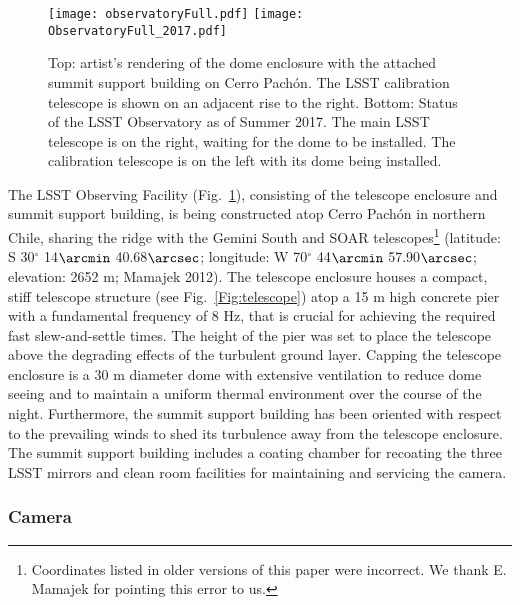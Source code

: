 \begin{figure}
\texttt{[image: observatoryFull.pdf]}
\texttt{[image: ObservatoryFull\_2017.pdf]}
\caption{Top: artist's rendering of the dome enclosure
with the attached summit support building on Cerro Pach\'{o}n. The LSST calibration
telescope is shown on an adjacent rise to the right.
Bottom: Status of the LSST Observatory as of Summer 2017. The main LSST telescope is on the right, waiting for the dome to be installed. The calibration telescope is on the left with its dome being installed.}
\label{Fig:observatory}
\end{figure}

The LSST Observing Facility (Fig.~\ref{Fig:observatory}),
consisting of the telescope enclosure and summit support building, is being constructed atop Cerro Pach\'{o}n in northern Chile,
sharing the ridge with the Gemini South and SOAR telescopes\footnote{Coordinates listed in older versions
of this paper were incorrect. We thank E. Mamajek for pointing this error to us.}
(latitude: S 30$^\circ$ 14$\arcmin$ 40.68$\arcsec$; longitude: W 70$^\circ$ 44$\arcmin$ 57.90$\arcsec$; elevation: 2652 m;
Mamajek 2012).  The telescope enclosure houses a compact, stiff
telescope structure (see Fig.~\ref{Fig:telescope}) atop a 15 m high concrete pier
with a fundamental frequency of 8 Hz, that is crucial for achieving the required fast slew-and-settle times.  The height of the pier was set to place the telescope above the degrading
effects of the turbulent ground layer.  Capping the telescope
enclosure is a 30 m diameter dome with extensive ventilation to reduce
dome seeing
and to maintain a uniform thermal environment over the course of the night.  Furthermore, the summit support
building has been oriented with respect to the prevailing winds to shed its turbulence away from the
telescope enclosure.  The summit support building includes a coating chamber for recoating the three LSST mirrors and
clean room facilities for maintaining and servicing the camera.




\vskip 0.2in
\subsubsection{ Camera }


